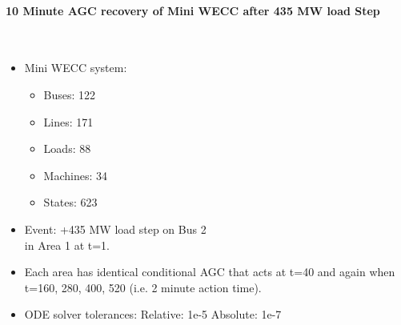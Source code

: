\documentclass[12pt]{article}
\begin{document}
\onehalfspacing
\paragraph{10 Minute AGC recovery of Mini WECC after 435 MW load Step} \ \\

\begin{minipage}{0.47\linewidth}
\begin{itemize}
\item Mini WECC system:
\begin{itemize}
 em
\small
\item Buses: 122
\item Lines: 171
\item Loads: 88
\item Machines: 34
\item States: 623
\end{itemize}
\item Event: +435 MW load step on Bus 2\\in Area 1 at t=1.

\item Each area has identical conditional AGC that acts at t=40 and again when t=160, 280, 400, 520 (i.e. 2 minute action time).

\item ODE solver tolerances:
\subitem Relative: 1e-5
\subitem Absolute: 1e-7

\end{itemize}
\vfill
\end{minipage}\hspace{2em}%
\end{document}
